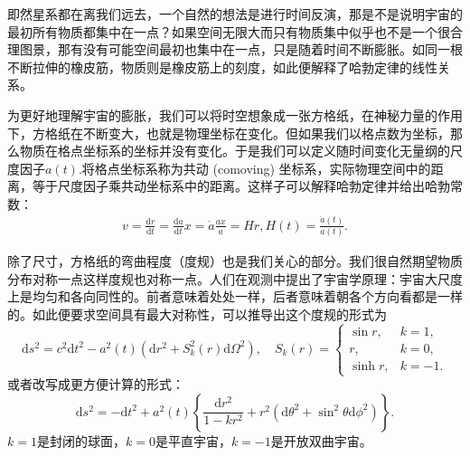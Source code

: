 \documentclass[../天体物理基础.tex]{subfiles}
\begin{document}
即然星系都在离我们远去，一个自然的想法是进行时间反演，那是不是说明宇宙的最初所有物质都集中在一点？如果空间无限大而只有物质集中似乎也不是一个很合理图景，那有没有可能空间最初也集中在一点，只是随着时间不断膨胀。如同一根不断拉伸的橡皮筋，物质则是橡皮筋上的刻度，如此便解释了哈勃定律的线性关系。

为更好地理解宇宙的膨胀，我们可以将时空想象成一张方格纸，在神秘力量的作用下，方格纸在不断变大，也就是物理坐标在变化。但如果我们以格点数为坐标，那么物质在格点坐标系的坐标并没有变化。于是我们可以定义随时间变化无量纲的尺度因子$a\left(t\right)$.将格点坐标系称为共动 (comoving) 坐标系，实际物理空间中的距离，等于尺度因子乘共动坐标系中的距离。这样子可以解释哈勃定律并给出哈勃常数：
\begin{align}
v=\frac{\mathrm{d}r}{\mathrm{d}t}=\frac{\mathrm{d}a}{\mathrm{d}t}x=\dot{a}\frac{ax}{a}=Hr,H\left(t\right)=\frac{\dot a\left(t\right)}{a\left(t\right)}.
\end{align}

除了尺寸，方格纸的弯曲程度（度规）也是我们关心的部分。我们很自然期望物质分布对称一点这样度规也对称一点。人们在观测中提出了宇宙学原理：宇宙大尺度上是均匀和各向同性的。前者意味着处处一样，后者意味着朝各个方向看都是一样的。如此便要求空间具有最大对称性，可以推导出这个度规的形式为
\begin{equation}
\mathrm{d}s^{2}=c^{2}\mathrm{d}t^{2}-a^{2}\left(t\right)\left(\mathrm{d}r^{2}+S_{k}^{2}\left(r\right)\mathrm{d}\Omega^{2}\right),\quad S_{k}\left(r\right)=
\begin{cases}
\sin r,&k=1,\\
r,&k=0,\\
\sinh r,&k=-1.
\end{cases}
\end{equation}
或者改写成更方便计算的形式：
\begin{equation}
\mathrm{d}s^{2}=-\mathrm{d}t^{2}+a^{2}\left(t\right)\left\{\frac{\mathrm{d}r^{2}}{1-kr^{2}}+r^{2}\left(\mathrm{d}\theta^{2}+\sin^{2}\theta\mathrm{d}\phi^{2}\right)\right\}.\label{1.6.4}
\end{equation}
$k=1$是封闭的球面，$k=0$是平直宇宙，$k=-1$是开放双曲宇宙。
\end{document}
